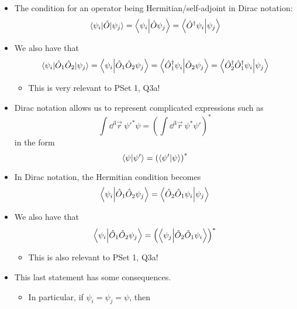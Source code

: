 \documentclass[../notes.tex]{subfiles}
\begin{document}
\begin{itemize}
\begin{itemize}
    \end{itemize}
    \item The condition for an operator being Hermitian/self-adjoint in Dirac notation:
    \begin{equation*}
        \mel{\psi_i}{\hat{O}}{\psi_j} = \braket{\psi_i}{\hat{O}\psi_j}
        = \braket{\hat{O}^\dagger\psi_i}{\psi_j}
    \end{equation*}
    \item We also have that
    \begin{equation*}
        \mel{\psi_i}{\hat{O}_1\hat{O}_2}{\psi_j} = \braket{\psi_i}{\hat{O}_1\hat{O}_2\psi_j}
        = \braket{\hat{O}_1^\dagger\psi_i}{\hat{O}_2\psi_j}
        = \braket{\hat{O}_2^\dagger\hat{O}_1^\dagger\psi_i}{\psi_j}
    \end{equation*}
    \begin{itemize}
        \item This is very relevant to PSet 1, Q3a!
    \end{itemize}
    \item Dirac notation allows us to represent complicated expressions such as
    \begin{equation*}
        \int\dd^3\vec{r}\ {\psi'}^*\psi = \left( \int\dd^3\vec{r}\ \psi^*\psi' \right)^*
    \end{equation*}
    in the form
    \begin{equation*}
        \braket{\psi}{\psi'} = \left( \braket{\psi'}{\psi} \right)^*
    \end{equation*}
    \item In Dirac notation, the Hermitian condition becomes
    \begin{equation*}
        \braket{\psi_i}{\hat{O}_1\hat{O}_2\psi_j} = \braket{\hat{O}_2\hat{O}_1\psi_i}{\psi_j}
    \end{equation*}
    \item We also have that
    \begin{equation*}
        \braket{\psi_i}{\hat{O}_1\hat{O}_2\psi_j} = \left( \braket{\psi_j}{\hat{O}_2\hat{O}_1\psi_i} \right)^*
    \end{equation*}
    \begin{itemize}
        \item This is also relevant to PSet 1, Q3a!
    \end{itemize}
    \item This last statement has some consequences.
    \begin{itemize}
        \item In particular, if $\psi_i=\psi_j=\psi$, then

\end{itemize}
\end{itemize}
\end{document}
